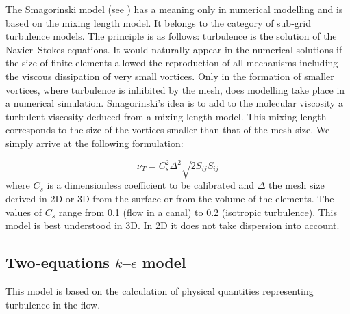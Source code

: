 The Smagorinski model (see \cite{smagorinski63}) has a meaning only in
numerical modelling and is based on the mixing length model. It belongs to the
category of sub-grid turbulence models. The principle is as follows:
turbulence is the solution of the Navier--Stokes equations. It would naturally
appear in the numerical solutions if the size of finite elements allowed the
reproduction of all mechanisms including the viscous dissipation of very small
vortices. Only in the formation of smaller vortices, where turbulence is
inhibited by the mesh, does modelling take place in a numerical simulation.
Smagorinski's idea is to add to the molecular viscosity a turbulent viscosity
deduced from a mixing length model. This mixing length corresponds to the size
of the vortices smaller than that of the mesh size. We simply arrive at the
following formulation:%

\begin{equation}
  \nu_T=C_{s}^{2}\Delta^{2}\sqrt{2S_{ij}S_{ij}}%
\end{equation}
where $C_{s}$ is a dimensionless coefficient to be calibrated and $\Delta$ the
mesh size derived in 2D or 3D from the surface or from the volume of the
elements. The values of $C_{s}$ range from 0.1 (flow in a canal) to 0.2
(isotropic turbulence). This model is best understood in 3D. In 2D it does not
take dispersion into account.


\subsection{\label{k-epsilon 3D}Two-equations $k$--$\epsilon$ model%
}

This model is based on the calculation of physical quantities representing
turbulence in the flow.
%
%

